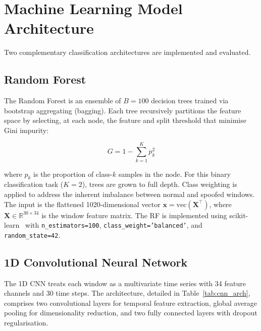 \section{Machine Learning Model Architecture}

Two complementary classification architectures are implemented and evaluated.

\subsection{Random Forest}

The Random Forest is an ensemble of \(B = 100\) decision trees trained via bootstrap aggregating (bagging). Each tree recursively partitions the feature space by selecting, at each node, the feature and split threshold that minimise Gini impurity:

\begin{equation}
    G = 1 - \sum_{k=1}^{K} p_k^2
    \label{eq:gini}
\end{equation}

where \(p_k\) is the proportion of class-\(k\) samples in the node. For this binary classification task (\(K = 2\)), trees are grown to full depth. Class weighting is applied to address the inherent imbalance between normal and spoofed windows. The input is the flattened 1020-dimensional vector \(\mathbf{x} = \text{vec}(\mathbf{X}^\top)\), where \(\mathbf{X} \in \mathbb{R}^{30 \times 34}\) is the window feature matrix. The RF is implemented using scikit-learn~\cite{Pedregosa2011} with \texttt{n\_estimators=100}, \texttt{class\_weight='balanced'}, and \texttt{random\_state=42}.

\subsection{1D Convolutional Neural Network}

The 1D CNN treats each window as a multivariate time series with 34 feature channels and 30 time steps. The architecture, detailed in Table~\ref{tab:cnn_arch}, comprises two convolutional layers for temporal feature extraction, global average pooling for dimensionality reduction, and two fully connected layers with dropout regularisation.

